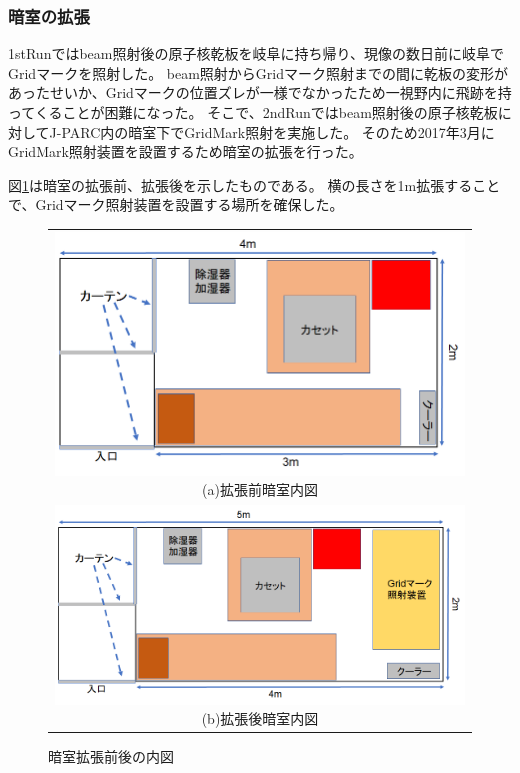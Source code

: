 \documentclass[12pt,a4paper]{jarticle}
\begin{document}
\subsubsection{暗室の拡張}
1stRunではbeam照射後の原子核乾板を岐阜に持ち帰り、現像の数日前に岐阜でGridマークを照射した。
beam照射からGridマーク照射までの間に乾板の変形があったせいか、Gridマークの位置ズレが一様でなかったため一視野内に飛跡を持ってくることが困難になった。
そこで、2ndRunではbeam照射後の原子核乾板に対してJ-PARC内の暗室下でGridMark照射を実施した。
そのため2017年3月にGridMark照射装置を設置するため暗室の拡張を行った。
\par
図\ref{fig:darkroom}は暗室の拡張前、拡張後を示したものである。
横の長さを1m拡張することで、Gridマーク照射装置を設置する場所を確保した。
\begin{figure}[htbp]
  \centering
    \begin{tabular}{c}
      \begin{minipage}{1.0\hsize}
        \centering
          \includegraphics[clip, width=140mm]{darkroom_before.png}
          \hspace{1.6cm} (a)拡張前暗室内図
      \end{minipage}
      \\
      \begin{minipage}{1.0\hsize}
        \centering
          \includegraphics[clip, width=140mm]{darkroom_after.png}
          \hspace{1.6cm} (b)拡張後暗室内図
      \end{minipage}
    \end{tabular}
    \caption{暗室拡張前後の内図\label{fig:darkroom}}
\end{figure}
\end{document}
